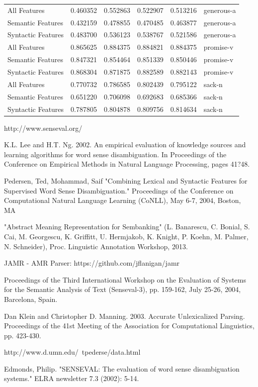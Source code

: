 \documentclass[12pt]{article}
\begin{document}
\begin{tabular}{lrrrrl}
All Features       &       0.460352 &  0.552863 &    0.522907 &    0.513216 &   generous-a \\
Semantic Features  &       0.432159 &  0.478855 &    0.470485 &    0.463877 &   generous-a \\
Syntactic Features &       0.483700 &  0.536123 &    0.538767 &    0.521586 &   generous-a \\
All Features       &       0.865625 &  0.884375 &    0.884821 &    0.884375 &    promise-v \\
Semantic Features  &       0.847321 &  0.854464 &    0.851339 &    0.850446 &    promise-v \\
Syntactic Features &       0.868304 &  0.871875 &    0.882589 &    0.882143 &    promise-v \\
All Features       &       0.770732 &  0.786585 &    0.802439 &    0.795122 &       sack-n \\
Semantic Features  &       0.651220 &  0.706098 &    0.692683 &    0.685366 &       sack-n \\
Syntactic Features &       0.787805 &  0.804878 &    0.809756 &    0.814634 &       sack-n \\
\bottomrule
\end{tabular} 

\begin{thebibliography}{9}

http://www.senseval.org/

K.L. Lee and H.T. Ng.  2002.  An empirical evaluation of knowledge sources and learning algorithms for word sense disambiguation.   In Proceedings of the Conference on Empirical Methods in Natural Language Processing, pages 41?48.

Pedersen, Ted, Mohammad, Saif  "Combining Lexical and Syntactic Features for Supervised Word Sense Disambiguation." Proceedings of the Conference on Computational Natural Language Learning (CoNLL), May 6-7, 2004, Boston, MA

"Abstract Meaning Representation for Sembanking" (L. Banarescu, C. Bonial, S. Cai, M. Georgescu, K. Griffitt, U. Hermjakob, K. Knight, P. Koehn, M. Palmer, N. Schneider), Proc. Linguistic Annotation Workshop, 2013. 

JAMR - AMR Parser: https://github.com/jflanigan/jamr

Proceedings of the Third International Workshop on the Evaluation of Systems for the Semantic Analysis of Text (Senseval-3), pp. 159-162, July 25-26, 2004, Barcelona, Spain. 

Dan Klein and Christopher D. Manning. 2003. Accurate Unlexicalized Parsing. Proceedings of the 41st Meeting of the Association for Computational Linguistics, pp. 423-430. 

http://www.d.umn.edu/~tpederse/data.html

Edmonds, Philip. "SENSEVAL: The evaluation of word sense disambiguation systems." ELRA newsletter 7.3 (2002): 5-14.

\end{thebibliography}
\end{document}
